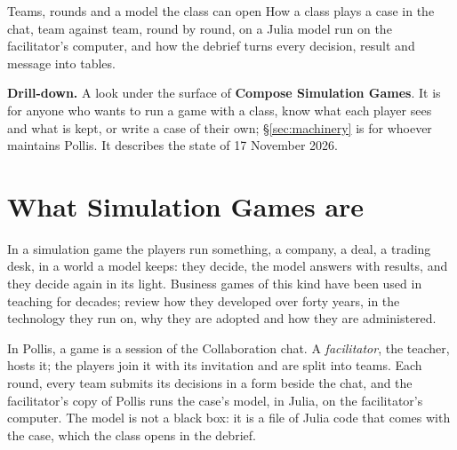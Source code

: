   {Teams, rounds and a model the class can open}
  {How a class plays a case in the chat, team against team, round by round, on a Julia model run on the
   facilitator's computer, and how the debrief turns every decision, result and message into tables.}

\begin{nbox}
{\color{amber}\bfseries Drill-down.}\enspace
A look under the surface of \textbf{Compose \gt Simulation Games}. It is for anyone who wants to
run a game with a class, know what each player sees and what is kept, or write a case of their own;
\S\ref{sec:machinery} is for whoever maintains Pollis. It describes the state of 17 November 2026.
\end{nbox}

\tableofcontents

\section{What Simulation Games are}\label{sec:what}
In a simulation game the players run something, a company, a deal, a trading desk, in a world a model keeps: they
decide, the model answers with results, and they decide again in its light. Business games of this kind have been
used in teaching for decades;  review how they
developed over forty years, in the technology they run on, why they are adopted and how they are administered.

In Pollis, a game is a session of the Collaboration chat. A \emph{facilitator}, the teacher, hosts it; the players
join it with its invitation and are split into teams. Each round, every team submits its decisions in a form beside
the chat, and the facilitator's copy of Pollis runs the case's model, in Julia, on the facilitator's computer. The
model is not a black box: it is a file of Julia code that comes with the case, which the class opens in the
debrief.

